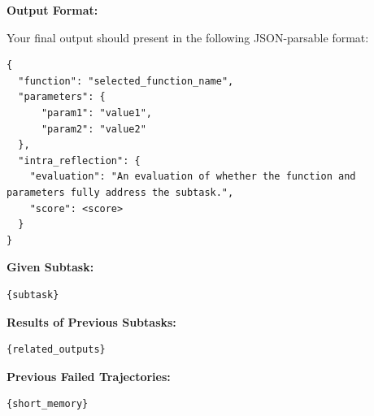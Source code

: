\documentclass{article}
\begin{document}
\begin{tcolorbox}[
    breakable,
    colback=yellow!5!white,
    colframe=yellow!75!black,
    title=Tool Agent System Prompt,
    fonttitle=\bfseries
]
\textbf{Output Format:}

Your final output should present in the following JSON-parsable format:

\begin{Verbatim}
{
  "function": "selected_function_name",
  "parameters": {
      "param1": "value1",
      "param2": "value2"
  },
  "intra_reflection": {
    "evaluation": "An evaluation of whether the function and parameters fully address the subtask.",
    "score": <score>
  }
}
\end{Verbatim}

\end{tcolorbox}

\begin{tcolorbox}[
    breakable,
    colback=yellow!5!white,
    colframe=yellow!75!black,
    title=Tool Agent User Prompt,
    fonttitle=\bfseries
]

\textbf{Given Subtask:}
\begin{Verbatim}
{subtask}
\end{Verbatim}

\textbf{Results of Previous Subtasks:}
\begin{Verbatim}
{related_outputs}
\end{Verbatim}

\textbf{Previous Failed Trajectories:}
\begin{Verbatim}
{short_memory}
\end{Verbatim}

\end{tcolorbox}
\end{document}
